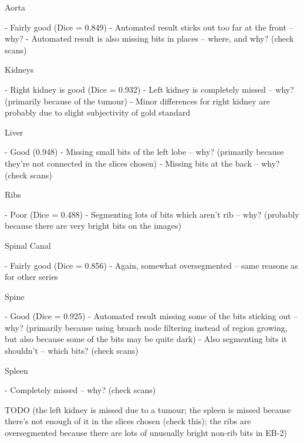 Aorta

- Fairly good (Dice = 0.849)
- Automated result sticks out too far at the front -- why?
- Automated result is also missing bits in places -- where, and why? (check scans)

Kidneys

- Right kidney is good (Dice = 0.932)
- Left kidney is completely missed -- why? (primarily because of the tumour)
- Minor differences for right kidney are probably due to slight subjectivity of gold standard

Liver

- Good (0.948)
- Missing small bits of the left lobe -- why? (primarily because they're not connected in the slices chosen)
- Missing bits at the back -- why? (check scans)

Ribs

- Poor (Dice = 0.488)
- Segmenting lots of bits which aren't rib -- why? (probably because there are very bright bits on the images)

Spinal Canal

- Fairly good (Dice = 0.856)
- Again, somewhat oversegmented -- same reasons as for other series

Spine

- Good (Dice = 0.925)
- Automated result missing some of the bits sticking out -- why? (primarily because using branch node filtering instead of region growing, but also because some of the bits may be quite dark)
- Also segmenting bits it shouldn't -- which bits? (check scans)

Spleen

- Completely missed -- why? (check scans)

\fi

TODO (the left kidney is missed due to a tumour; the spleen is missed because there's not enough of it in the slices chosen (check this); the ribs are oversegmented because there are lots of unusually bright non-rib bits in EB-2)

